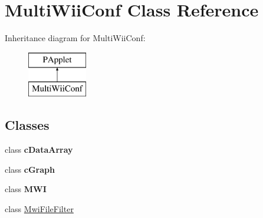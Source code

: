 \hypertarget{classMultiWiiConf}{\section{Multi\-Wii\-Conf Class Reference}
\label{classMultiWiiConf}
}
Inheritance diagram for Multi\-Wii\-Conf\-:\begin{figure}[H]
\begin{center}
\leavevmode
\includegraphics[height=2.000000cm]{classMultiWiiConf}
\end{center}
\end{figure}
\subsection*{Classes}
\begin{DoxyCompactItemize}
\item 
class {\bfseries c\-Data\-Array}
\item 
class {\bfseries c\-Graph}
\item 
class {\bfseries M\-W\-I}
\item 
class \hyperlink{classMultiWiiConf_1_1MwiFileFilter}{Mwi\-File\-Filter}
\end{DoxyCompactItemize}

